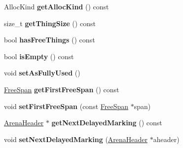 \begin{DoxyCompactItemize}
\item 
\hypertarget{structjs_1_1gc_1_1_arena_header_a563d51558f202633772a17c35ab78a1b}{Alloc\-Kind {\bfseries get\-Alloc\-Kind} () const }\label{structjs_1_1gc_1_1_arena_header_a563d51558f202633772a17c35ab78a1b}

\item 
\hypertarget{structjs_1_1gc_1_1_arena_header_a8a9968e568461e2659b5f983f2456924}{size\-\_\-t {\bfseries get\-Thing\-Size} () const }\label{structjs_1_1gc_1_1_arena_header_a8a9968e568461e2659b5f983f2456924}

\item 
\hypertarget{structjs_1_1gc_1_1_arena_header_a71892acb71ddc8884db25dd8cf776d3c}{bool {\bfseries has\-Free\-Things} () const }\label{structjs_1_1gc_1_1_arena_header_a71892acb71ddc8884db25dd8cf776d3c}

\item 
\hypertarget{structjs_1_1gc_1_1_arena_header_a177227bab5f150b38972d7b34761776e}{bool {\bfseries is\-Empty} () const }\label{structjs_1_1gc_1_1_arena_header_a177227bab5f150b38972d7b34761776e}

\item 
\hypertarget{structjs_1_1gc_1_1_arena_header_a28cad9119b626a68726fed606c0aacb5}{void {\bfseries set\-As\-Fully\-Used} ()}\label{structjs_1_1gc_1_1_arena_header_a28cad9119b626a68726fed606c0aacb5}

\item 
\hypertarget{structjs_1_1gc_1_1_arena_header_a3a99f0172d65e06f947fe41948304045}{\hyperlink{structjs_1_1gc_1_1_free_span}{Free\-Span} {\bfseries get\-First\-Free\-Span} () const }\label{structjs_1_1gc_1_1_arena_header_a3a99f0172d65e06f947fe41948304045}

\item 
\hypertarget{structjs_1_1gc_1_1_arena_header_ae4a75e03f193d16809ce485f8c4ba662}{void {\bfseries set\-First\-Free\-Span} (const \hyperlink{structjs_1_1gc_1_1_free_span}{Free\-Span} $\ast$span)}\label{structjs_1_1gc_1_1_arena_header_ae4a75e03f193d16809ce485f8c4ba662}

\item 
\hypertarget{structjs_1_1gc_1_1_arena_header_a520c199499400cd4fce7144fdff9a39b}{\hyperlink{structjs_1_1gc_1_1_arena_header}{Arena\-Header} $\ast$ {\bfseries get\-Next\-Delayed\-Marking} () const }\label{structjs_1_1gc_1_1_arena_header_a520c199499400cd4fce7144fdff9a39b}

\item 
\hypertarget{structjs_1_1gc_1_1_arena_header_abdb262f43f1f44c4f90c8642200dd0d4}{void {\bfseries set\-Next\-Delayed\-Marking} (\hyperlink{structjs_1_1gc_1_1_arena_header}{Arena\-Header} $\ast$aheader)}\label{structjs_1_1gc_1_1_arena_header_abdb262f43f1f44c4f90c8642200dd0d4}


\end{DoxyCompactItemize}
